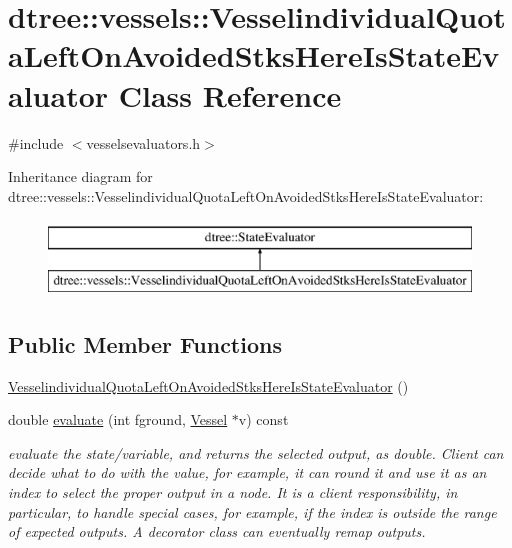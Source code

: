 \hypertarget{classdtree_1_1vessels_1_1_vesselindividual_quota_left_on_avoided_stks_here_is_state_evaluator}{}\section{dtree\+::vessels\+::Vesselindividual\+Quota\+Left\+On\+Avoided\+Stks\+Here\+Is\+State\+Evaluator Class Reference}
\label{classdtree_1_1vessels_1_1_vesselindividual_quota_left_on_avoided_stks_here_is_state_evaluator}


{\ttfamily \#include $<$vesselsevaluators.\+h$>$}

Inheritance diagram for dtree\+::vessels\+::Vesselindividual\+Quota\+Left\+On\+Avoided\+Stks\+Here\+Is\+State\+Evaluator\+:\begin{figure}[H]
\begin{center}
\leavevmode
\includegraphics[height=2.000000cm]{d0/d1e/classdtree_1_1vessels_1_1_vesselindividual_quota_left_on_avoided_stks_here_is_state_evaluator}
\end{center}
\end{figure}
\subsection*{Public Member Functions}
\begin{DoxyCompactItemize}
\item 
\mbox{\hyperlink{classdtree_1_1vessels_1_1_vesselindividual_quota_left_on_avoided_stks_here_is_state_evaluator_aeffc115847f0fbbac301c73d1acc7d14}{Vesselindividual\+Quota\+Left\+On\+Avoided\+Stks\+Here\+Is\+State\+Evaluator}} ()
\item 
double \mbox{\hyperlink{classdtree_1_1vessels_1_1_vesselindividual_quota_left_on_avoided_stks_here_is_state_evaluator_a7d3f3c7db7b95a687cc4105b81c0f7f0}{evaluate}} (int fground, \mbox{\hyperlink{class_vessel}{Vessel}} $\ast$v) const
\begin{DoxyCompactList}\small\item\em evaluate the state/variable, and returns the selected output, as double. Client can decide what to do with the value, for example, it can round it and use it as an index to select the proper output in a node. It is a client responsibility, in particular, to handle special cases, for example, if the index is outside the range of expected outputs. A decorator class can eventually remap outputs. \end{DoxyCompactList}\end{DoxyCompactItemize}


